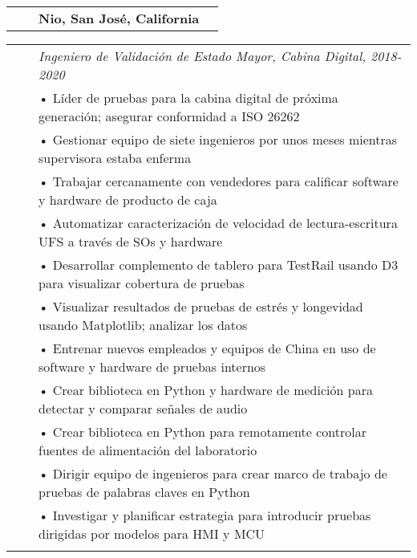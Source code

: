 \documentclass{minimal}
\begin{document}
\begin{tabular}{ p{1.5cm} p{1cm} p{16cm} >{\raggedleft\arraybackslash}p{3cm} }
& & \textbf{Nio, San José, California} & \\
\end{tabular}

\begin{tabular}{ p{1.5cm} p{1cm} p{16cm} }
& & \textit{Ingeniero de Validación de Estado Mayor, Cabina Digital, 2018-2020}\\
& & • Líder de pruebas para la cabina digital de próxima generación; asegurar conformidad a ISO 26262\\
& & • Gestionar equipo de siete ingenieros por unos meses mientras supervisora estaba enferma\\
& & • Trabajar cercanamente con vendedores para calificar software y hardware de producto de caja\\
& & • Automatizar caracterización de velocidad de lectura-escritura UFS a través de SOs y hardware\\
& & • Desarrollar complemento de tablero para TestRail usando D3 para visualizar cobertura de pruebas\\
& & • Visualizar resultados de pruebas de estrés y longevidad usando Matplotlib; analizar los datos\\
& & • Entrenar nuevos empleados y equipos de China en uso de software y hardware de pruebas internos\\
& & • Crear biblioteca en Python y hardware de medición para detectar y comparar señales de audio\\
& & • Crear biblioteca en Python para remotamente controlar fuentes de alimentación del laboratorio\\
& & • Dirigir equipo de ingenieros para crear marco de trabajo de pruebas de palabras claves en Python\\
& & • Investigar y planificar estrategia para introducir pruebas dirigidas por modelos para HMI y MCU\\
& & \\
\end{tabular}
\end{document}
